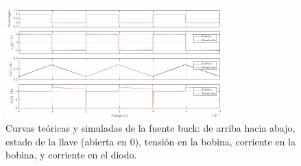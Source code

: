 \documentclass[e4_tp1_main.tex]{subfiles}
\begin{document}
\begin{figure}[ht]
	\centering
	\includegraphics[width=0.75\textwidth]{images/ej2/curvas.png}
	\caption{Curvas te\'oricas y simuladas de la fuente buck: de arriba hacia abajo, estado de la llave (abierta en 0), tensi\'on en la bobina, corriente en la bobina, y corriente en el diodo.}
	\label{fig:buck-curvas}
\end{figure}
\end{document}

